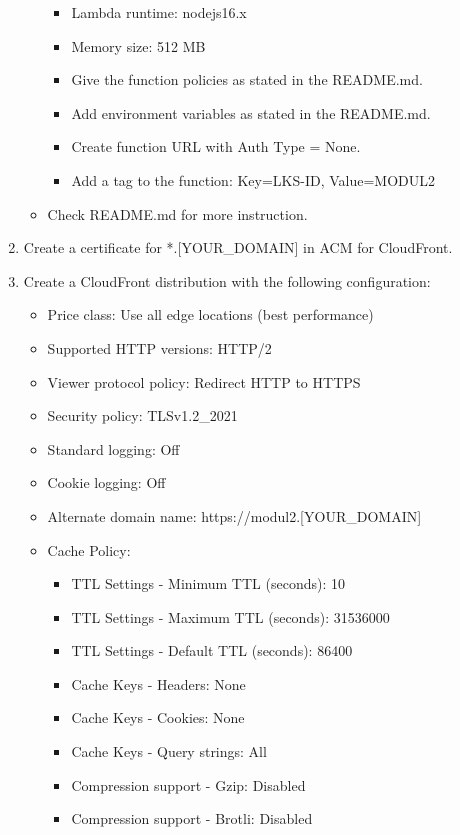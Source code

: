 \documentclass{article}
\begin{document}
\begin{enumerate}
\begin{itemize}
    \begin{itemize}
      \item Lambda runtime: nodejs16.x
      \item Memory size: 512 MB
      \item Give the function policies as stated in the README.md.
      \item Add environment variables as stated in the README.md.
      \item Create function URL with Auth Type = None.
      \item Add a tag to the function: Key=LKS-ID, Value=MODUL2
    \end{itemize}
    \item Check README.md for more instruction.
  \end{itemize}
\item Create a certificate for *.[YOUR\_DOMAIN] in ACM for CloudFront.
\item Create a CloudFront distribution with the following configuration:
  \begin{itemize}
    \item Price class: Use all edge locations (best performance)
    \item Supported HTTP versions: HTTP/2
    \item Viewer protocol policy: Redirect HTTP to HTTPS
    \item Security policy: TLSv1.2\_2021
    \item Standard logging: Off
    \item Cookie logging: Off
    \item Alternate domain name: https://modul2.[YOUR\_DOMAIN]
    \item Cache Policy:
    \begin{itemize}
      \item TTL Settings - Minimum TTL (seconds): 10
      \item TTL Settings - Maximum TTL (seconds): 31536000
      \item TTL Settings - Default TTL (seconds): 86400
      \item Cache Keys - Headers: None
      \item Cache Keys - Cookies: None
      \item Cache Keys - Query strings: All
      \item Compression support - Gzip: Disabled
      \item Compression support - Brotli: Disabled
    \end{itemize}

\end{itemize}
\end{enumerate}
\end{document}
